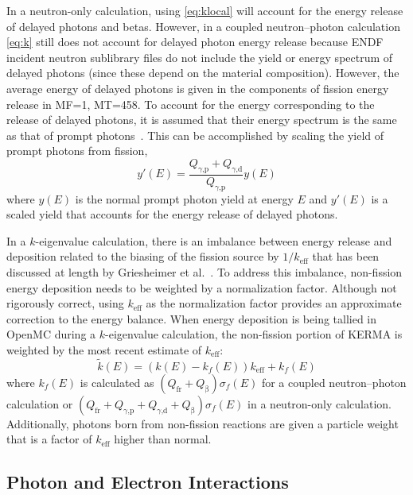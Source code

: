 \documentclass{anstrans}
\newcommand{\efr}{Q_\text{fr}}
\newcommand{\egp}{Q_\text{$\gamma$,p}}
\newcommand{\egd}{Q_\text{$\gamma$,d}}
\newcommand{\eb}{Q_\upbeta}
\begin{document}
In a neutron-only calculation, using \cref{eq:klocal} will account for the
energy release of delayed photons and betas. However, in a coupled
neutron--photon calculation \cref{eq:k} still does not account for delayed
photon energy release because ENDF incident neutron sublibrary files do not
include the yield or energy spectrum of delayed photons (since these depend on
the material composition). However, the average energy of delayed photons is
given in the components of fission energy release in MF=1, MT=458. To account
for the energy corresponding to the release of delayed photons, it is assumed
that their energy spectrum is the same as that of prompt
photons~\cite{tuominen2019ane}. This can be accomplished by scaling the yield of
prompt photons from fission,
\begin{equation}
    y'(E) = \frac{\egp + \egd}{\egp} y(E)
\end{equation}
where $y(E)$ is the normal prompt photon yield at energy $E$ and $y'(E)$ is a
scaled yield that accounts for the energy release of delayed photons.

In a $k$-eigenvalue calculation, there is an imbalance between energy release
and deposition related to the biasing of the fission source by $1/k_\text{eff}$
that has been discussed at length by Griesheimer et
al.~\cite{griesheimer2020physor}. To address this imbalance, non-fission energy
deposition needs to be weighted by a normalization factor. Although not
rigorously correct, using $k_\text{eff}$ as the normalization factor provides an
approximate correction to the energy balance. When energy deposition is being
tallied in OpenMC during a $k$-eigenvalue calculation, the non-fission portion
of KERMA is weighted by the most recent estimate of $k_\text{eff}$:
\begin{equation}
    \tilde{k}(E) = \left ( k(E) - k_f(E) \right) k_\text{eff} + k_f(E)
\end{equation}
where $k_f(E)$ is calculated as $\left ( \efr + \eb \right ) \sigma_f(E)$ for a
coupled neutron--photon calculation or $\left ( \efr + \egp + \egd + \eb \right)
\sigma_f(E)$ in a neutron-only calculation. Additionally, photons born from
non-fission reactions are given a particle weight that is a factor of
$k_\text{eff}$ higher than normal.


\subsection{Photon and Electron Interactions}
\end{document}
